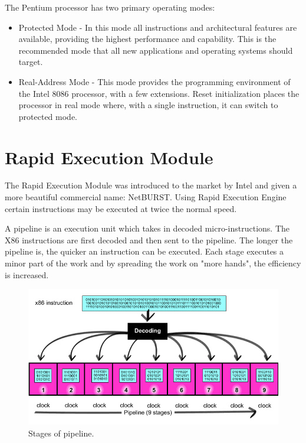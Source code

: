 \documentclass[doc,natbib,12pt]{apa6}
\begin{document}
	The Pentium processor has two primary operating modes: \citep{Das}
	\begin{itemize}
		\item Protected Mode - In this mode all instructions and architectural features are available, providing the highest performance and capability. This is the recommended mode that all new applications and operating systems should target.
		\item Real-Address Mode - This mode provides the programming environment of the Intel 8086 processor, with a few extensions. Reset initialization places the processor in real mode where, with a single instruction, it can switch to protected mode.
	\end{itemize}
	
	\newpage
	\section{Rapid Execution Module} \label{chp:rapidExecutionModule}
	The Rapid Execution Module was introduced to the market by Intel and given a more beautiful commercial name: NetBURST. Using Rapid Execution Engine certain instructions may be executed at twice the normal speed.
	
	A pipeline is an execution unit which takes in decoded micro-instructions. The X86 instructions are first decoded and then sent to the pipeline. The longer the pipeline is, the quicker an instruction can be executed. Each stage executes a minor part of the work and by spreading the work on "more hands", the efficiency is increased.\citep{Karbosguide}
	
	
	\begin{figure}[htpb]
		\centering
		\includegraphics[width=1\textwidth]{_775.png}
		\caption{\label{fig:20stage}Stages of pipeline. \citep{Karbosguide}}
	\end{figure}
	
\end{document}
